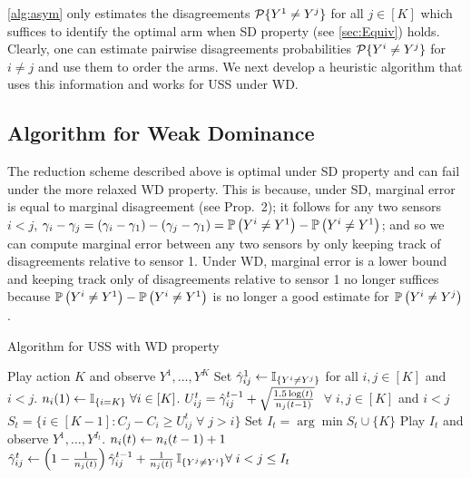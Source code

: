 \cref{alg:asym} only estimates the disagreements $\P\{Y^1 \neq Y^j\}$ for all $j \in [K]$ which suffices to identify the optimal arm when SD property (see \cref{sec:Equiv}) holds. Clearly, one can estimate pairwise disagreements probabilities $\P\{Y^i \neq Y^j\}$ for $i\neq j$ and use them to order the arms. We next develop a heuristic algorithm that uses this information and works for USS under WD. 

\subsection{Algorithm for Weak Dominance}
The reduction scheme described above is optimal under SD property and can fail under the more relaxed WD property. This is because, under SD, marginal error is equal to marginal disagreement (see Prop.~2); it follows for any two sensors $i < j$, $\gamma_i-\gamma_j = (\gamma_i-\gamma_1) - (\gamma_j-\gamma_1) = \Prob{Y^i\ne Y^1} - \Prob{Y^i\ne Y^1}$; and so we can compute marginal error between any two sensors by only keeping track of disagreements relative to sensor 1. Under WD, marginal error is a lower bound and keeping track only of disagreements relative to sensor 1 no longer suffices because $\Prob{Y^i\ne Y^1} - \Prob{Y^i\ne Y^1}$ is no longer a good estimate for $\Prob{Y^i\ne Y^j}$.
\begin{center}
\begin{minipage}{0.48\textwidth}
		\begin{algorithm}[H]
			\caption{Algorithm for USS with WD property} %
			\label{alg:UCB}
			\begin{algorithmic}[1]
				\STATE Play action $K$ and observe $Y^1,\dots,Y^K$
				\STATE Set $\hgamma_{ij}^1 \set \one{Y^i\ne Y^j}$ for all $i,j\in [K]$ and $i < j$.
				\STATE $n_i(1)\leftarrow \one{i=K} \; \forall i\in [K]$.
				\STATE $U_{ij}^t=\hgamma_{ij}^{t-1} + \sqrt{\frac{1.5\log(t)}{n_j(t-1)}}$  $\;\forall \; i,j \in [K]$ and $i<j$ \label{algo:UCB}
				\STATE $S_t=\{i \in [K-1]: C_j-C_i \geq U_{ij}^t \;\forall \;   j > i \}$ \label{algo:sort}
				\STATE Set $I_t= \arg \min S_t \cup \{K\} $
				\STATE Play $I_t$ and observe $Y^1,\dots,Y^{I_t}$.
				\STATE $n_i(t) \set n_i(t-1)+1$\\
				 \STATE $\hgamma_{ij}^t \set \left (1-\frac{1}{n_j(t)}\right )
				 \hgamma_{ij}^{t-1} + \frac{1}{n_j(t)} \,\one{Y^j\ne Y^i} \forall \; i<j \leq I_t$ \label{algo:Update}
				\ENDFOR
				\ENDFOR
			\end{algorithmic}
		\end{algorithm}
	\end{minipage}
\end{center}

